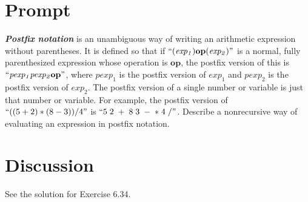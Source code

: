 \documentclass[11pt]{article}
\begin{document}
    \section*{Prompt}\label{sec:prompt}

\textbf{\textit{Postfix notation}} is an unambiguous way of writing an arithmetic expression without parentheses.
    It is defined so that if $``(\mathit{exp_1})\mathbf{op}(\mathit{exp_2})"$ is a
normal, fully parenthesized expression whose operation is $\mathbf{op}$, the postfix
version of this is $``\mathit{pexp_1} \mathit{pexp_2} \mathbf{op}"$, where $\mathit{pexp_1}$ is the postfix version of
$\mathit{exp_1}$ and $\mathit{pexp_2}$ is the postfix version of $\mathit{exp_2}$. The postfix version of a single number or
    variable is just that number or variable. For example, the
postfix version of $``((5+2) \ast (8-3))/4"$ is $``5 \; 2 \; + \; 8 \; 3 \; - \; \ast \; 4 \; /"$. Describe
a nonrecursive way of evaluating an expression in postfix notation.

    \pagebreak

    \section*{Discussion}\label{sec:discussion}
    See the solution for Exercise 6.34.
\end{document}
